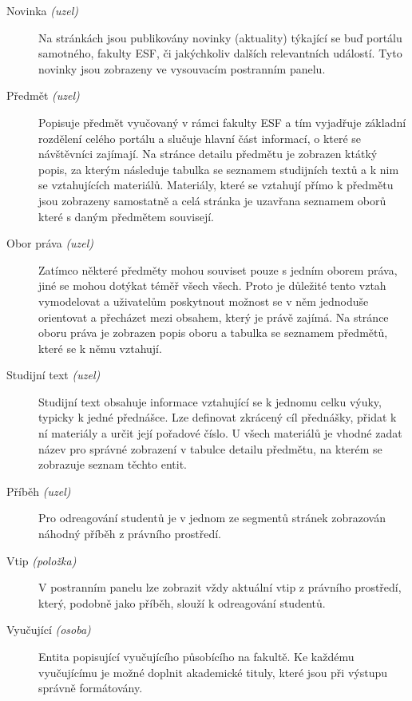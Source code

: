 \begin{description}
  \item[Novinka \emph{(uzel)}] Na stránkách jsou publikovány novinky (aktuality) týkající se buď portálu samotného, fakulty ESF, či jakýchkoliv dalších relevantních událostí. Tyto novinky jsou zobrazeny ve vysouvacím postranním panelu.
  
  \item[Předmět \emph{(uzel)}] Popisuje předmět vyučovaný v rámci fakulty ESF a tím vyjadřuje základní rozdělení celého portálu a slučuje hlavní část informací, o které se návštěvníci zajímají. Na stránce detailu předmětu je zobrazen ktátký popis, za kterým následuje tabulka se seznamem studijních textů a k nim se vztahujících materiálů. Materiály, které se vztahují přímo k předmětu jsou zobrazeny samostatně a celá stránka je uzavřana seznamem oborů které s daným předmětem souvisejí.

  \item[Obor práva \emph{(uzel)}] Zatímco některé předměty mohou souviset pouze s jedním oborem práva, jiné se mohou dotýkat téměř všech všech. Proto je důležité tento vztah vymodelovat a uživatelům poskytnout možnost se v něm jednoduše orientovat a přecházet mezi obsahem, který je právě zajímá. Na stránce oboru práva je zobrazen popis oboru a tabulka se seznamem předmětů, které se k němu vztahují.

  \item[Studijní text \emph{(uzel)}] Studijní text obsahuje informace vztahující se k jednomu celku výuky, typicky k jedné přednášce. Lze definovat zkrácený cíl přednášky, přidat k ní materiály a určit její pořadové číslo. U všech materiálů je vhodné zadat název pro správné zobrazení v tabulce detailu předmětu, na kterém se zobrazuje seznam těchto entit.

  \item[Příběh \emph{(uzel)}] Pro odreagování studentů je v jednom ze segmentů stránek zobrazován náhodný příběh z právního prostředí. 

  \item[Vtip \emph{(položka)}] V postranním panelu lze zobrazit vždy aktuální vtip z právního prostředí, který, podobně jako příběh, slouží k odreagování studentů. 

  \item[Vyučující \emph{(osoba)}] Entita popisující vyučujícího působícího na fakultě. Ke každému vyučujícímu je možné doplnit akademické tituly, které jsou při výstupu správně formátovány.
\end{description}

